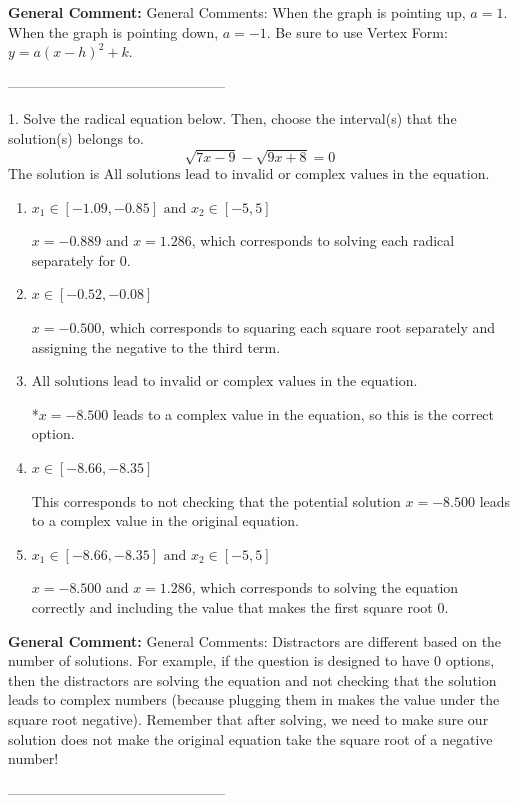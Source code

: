 \documentclass{extbook}[14pt]
\begin{document}
\textbf{General Comment:} General Comments: When the graph is pointing up, $a=1$. When the graph is pointing down, $a=-1$. Be sure to use Vertex Form: $y = a(x-h)^2+k$. 

-----------------------------------------------

1. Solve the radical equation below. Then, choose the interval(s) that the solution(s) belongs to.
\[ \sqrt{7 x - 9} - \sqrt{9 x + 8} = 0 \] 
The solution is $ \text{All solutions lead to invalid or complex values in the equation.} $ 

\begin{enumerate}[label=\Alph*.] 
\item $ x_1 \in [-1.09, -0.85] \text{ and } x_2 \in [-5,5] $ 

 $x = -0.889$ and $x = 1.286$, which corresponds to solving each radical separately for 0. 
\item $ x \in [-0.52,-0.08] $ 

 $x = -0.500$, which corresponds to squaring each square root separately and assigning the negative to the third term. 
\item $ \text{All solutions lead to invalid or complex values in the equation.} $ 

 *$x = -8.500$ leads to a complex value in the equation, so this is the correct option. 
\item $ x \in [-8.66,-8.35] $ 

 This corresponds to not checking that the potential solution $x = -8.500$ leads to a complex value in the original equation. 
\item $ x_1 \in [-8.66, -8.35] \text{ and } x_2 \in [-5,5] $ 

 $x = -8.500$ and $x = 1.286$, which corresponds to solving the equation correctly and including the value that makes the first square root 0. 
\end{enumerate} 
 
\textbf{General Comment:} General Comments: Distractors are different based on the number of solutions. For example, if the question is designed to have 0 options, then the distractors are solving the equation and not checking that the solution leads to complex numbers (because plugging them in makes the value under the square root negative). Remember that after solving, we need to make sure our solution does not make the original equation take the square root of a negative number! 

-----------------------------------------------
\end{document}
